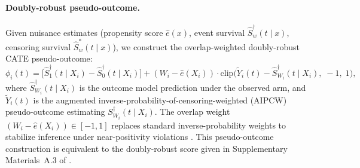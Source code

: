 \documentclass{article}
\newcommand{\hate}{\hat{e}}
\newcommand{\hatS}{\hat{S}}
\begin{document}
\paragraph{Doubly-robust pseudo-outcome.}
Given nuisance estimates (propensity score $\hate(x)$, event survival $\hatS^\dagger_w(t \mid x)$, censoring survival $\hatS^*_w(t \mid x)$), we construct the overlap-weighted doubly-robust CATE pseudo-outcome:
\begin{equation}\label{eq:phi-appendix}
\phi_i(t) = \bigl[\hatS^\dagger_1(t \mid X_i) - \hatS^\dagger_0(t \mid X_i)\bigr] + (W_i - \hate(X_i)) \cdot \mathrm{clip}\bigl(\tilde{Y}_i(t) - \hatS^\dagger_{W_i}(t \mid X_i),\; -1,\; 1\bigr),
\end{equation}
where $\hatS^\dagger_{W_i}(t \mid X_i)$ is the outcome model prediction under the observed arm, and $\tilde{Y}_i(t)$ is the augmented inverse-probability-of-censoring-weighted (AIPCW) pseudo-outcome estimating $S^\dagger_{W_i}(t \mid X_i)$.
The overlap weight $(W_i - \hate(X_i)) \in [-1, 1]$ replaces standard inverse-probability weights to stabilize inference under near-positivity violations \citep{li2018balancing}.
This pseudo-outcome construction is equivalent to the doubly-robust score given in Supplementary Materials~A.3 of \citet{yadlowsky2025rate}.
\end{document}
